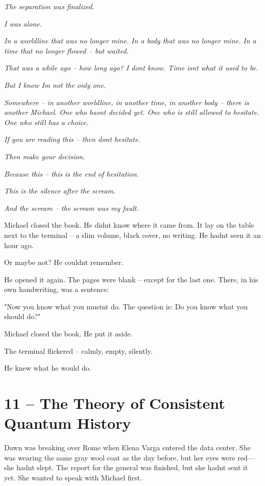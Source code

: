 \documentclass[
]{article}
\begin{document}
\emph{The separation was finalized.}

\emph{I was alone.}

\emph{In a worldline that was no longer mine. In a body that was no longer mine. In a time that no longer flowed -- but waited.}

\emph{That was a while ago -- how long ago? I don\textquotesingle t know. Time isn\textquotesingle t what it used to be.}

\emph{But I know I\textquotesingle m not the only one.}

\emph{Somewhere -- in another worldline, in another time, in another body -- there is another Michael. One who hasn\textquotesingle t decided yet. One who is still allowed to hesitate. One who still has a choice.}

\emph{If you are reading this -- then don\textquotesingle t hesitate.}

\emph{Then make your decision.}

\emph{Because this -- this is the end of hesitation.}

\emph{This is the silence after the scream.}

\emph{And the scream -- the scream was my fault.}

Michael closed the book. He didn\textquotesingle t know where it came from. It lay on the table next to the terminal -- a slim volume, black cover, no writing. He hadn\textquotesingle t seen it an hour ago.

Or maybe not? He couldn\textquotesingle t remember.

He opened it again. The pages were blank -- except for the last one. There, in his own handwriting, was a sentence:

"Now you know what you mustn\textquotesingle t do. The question is: Do you know what you should do?"

Michael closed the book. He put it aside.

The terminal flickered -- calmly, empty, silently.

He knew what he would do.

\section{11 -- The Theory of Consistent Quantum History}\label{the-theory-of-consistent-quantum-history}

Dawn was breaking over Rome when Elena Varga entered the data center. She was wearing the same gray wool coat as the day before, but her eyes were red---she hadn\textquotesingle t slept. The report for the general was finished, but she hadn\textquotesingle t sent it yet. She wanted to speak with Michael first.
\end{document}
